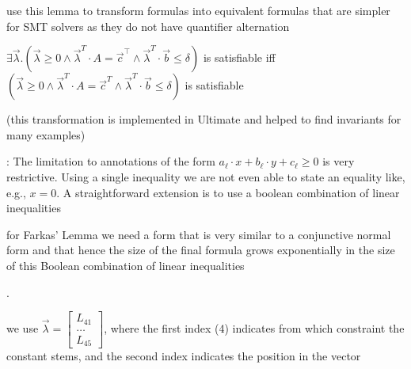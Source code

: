 \documentclass[landscape, a4paper]{article}
\begin{document}
\begin{minipage}[t]{0.2\linewidth}
\begin{betterlist}
\begin{betterlist}
\begin{betterlist}
				\begin{betterlist}
					\item use this lemma to transform formulas into equivalent formulas that are simpler for SMT solvers as they do not have quantifier alternation
					\item $\exists\vec{\lambda}.(\vec{\lambda} \geq 0 \land\vec{\lambda}^T\cdot  A =\vec{c}^⊺\land\vec{\lambda}^T\cdot \vec{b} \leq \delta )$ is satisfiable iff $(\vec{\lambda}  \geq 0 \land\vec{\lambda}^T\cdot A =\vec{c}^T\land\vec{\lambda}^T\cdot \vec{b} \leq \delta)$ is satisfiable
					\item {}
					\item (this transformation is implemented in Ultimate and helped to find invariants for many examples)
				\end{betterlist}
			\end{betterlist}
			\item {}: The limitation to annotations of the form $a_{\ell} \cdot  x + b_{\ell} \cdot  y + c_{\ell} \geq 0$ is very restrictive. Using a single inequality we are not even able to state an equality like, e.g., $x = 0$. A straightforward extension is to use a boolean combination of linear inequalities
			\item for Farkas’ Lemma we need a form that is very similar to a conjunctive normal form and that hence the size of the final formula grows \alert{exponentially} in the size of this Boolean combination of linear inequalities
			\item {}. \script{541}{End result}
			\begin{betterlist}
				\item we use $\vec{\lambda}=\left[\begin{array}{c}L_{41}\\\ldots\\L_{45}\end{array}\right]$, where the first index (4) indicates from which constraint the constant stems, and the second index indicates the position in the vector
			\end{betterlist}
		\end{betterlist}
	\end{betterlist}

\end{minipage}
\end{document}

